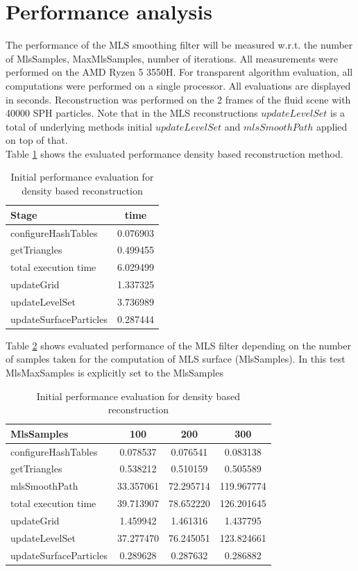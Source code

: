 \section{Performance analysis}
The performance of the MLS smoothing filter will be measured w.r.t. the number of MlsSamples, MaxMlsSamples, number of iterations. All measurements were performed on the AMD Ryzen 5 3550H. For transparent algorithm evaluation, all computations were performed on a single processor. All evaluations are displayed in seconds. Reconstruction was performed on the 2 frames of the fluid scene with 40000 SPH particles. Note that in the MLS reconstructions $updateLevelSet$ is a total of underlying methods initial $updateLevelSet$ and $mlsSmoothPath$ applied on top of that.\\
Table \ref{tab:mls_initial_method} shows the evaluated performance density based reconstruction method.
\begin{table}[H]
	\begin{center}
		\scriptsize
		\begin{tabular}{|l|c|}
			\hline
			Stage & time \\
			\hline
				configureHashTables	&	0.076903\\
				getTriangles	&	0.499455\\
				total execution time	&	6.029499\\
				updateGrid	&	1.337325\\
				updateLevelSet	&	3.736989\\
				updateSurfaceParticles	&	0.287444\\
			\hline
		\end{tabular}
	\end{center}
	\caption{Initial performance evaluation for density based reconstruction}
	\label{tab:mls_initial_method}
\end{table}
Table \ref{tab:mls_ms_perf} shows evaluated performance of the MLS filter depending on the number of samples taken for the computation of MLS surface (MlsSamples). In this test MlsMaxSamples is explicitly set to the MlsSamples
\begin{table}[H]
	\begin{center}
		\scriptsize
		\begin{tabular}{|l|c|c|c|}
			\hline
			MlsSamples & 100 & 200 & 300 \\
			\hline
			configureHashTables		&	0.078537	&	0.076541	&	0.083138\\
			getTriangles			&	0.538212	&	0.510159	&	0.505589\\
			mlsSmoothPath			&	33.357061	&	72.295714	&	119.967774\\
			total execution time	&	39.713907	&	78.652220	&	126.201645\\
			updateGrid				&	1.459942	&	1.461316	&	1.437795\\
			updateLevelSet			&	37.277470	&	76.245051	&	123.824661\\
			updateSurfaceParticles	&	0.289628	&	0.287632	&	0.286882\\
			\hline
		\end{tabular}
	\end{center}
	\caption{Initial performance evaluation for density based reconstruction}
	\label{tab:mls_ms_perf}
\end{table}
